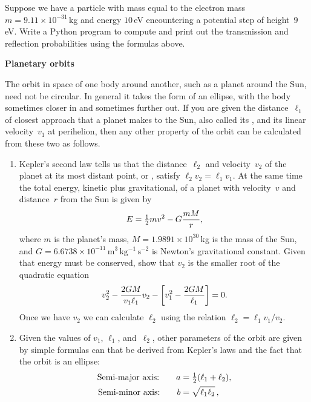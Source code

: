 \documentclass[12pt]{article}
\begin{document}
\begin{exercises}
Suppose we have a particle with mass equal to the electron mass
$m=9.11\times10^{-31}\,$kg and energy $10\,$eV encountering a potential
step of height~$9\,$eV.  Write a Python program to compute and print out
the transmission and reflection probabilities using the formulas above.



\exercise \textbf{Planetary orbits}

\nopagebreak\smallskip\noindent The orbit in space of one body
around another, such as a planet around the Sun, need not be
circular.  In general it takes the form of an ellipse, with the body
sometimes closer in and sometimes further out.  If you are given the
distance~$\ell_1$ of closest approach that a planet makes to the Sun, also
called its , and its linear velocity~$v_1$ at
perihelion, then any other property of the orbit can be calculated
from these two as follows.
\begin{enumerate}\setlength{\itemsep}{0pt}
\item Kepler's second law tells us that the distance~$\ell_2$ and
  velocity~$v_2$ of the planet at its most distant point, or
  , satisfy $\ell_2 v_2 = \ell_1 v_1$.  At the same
  time the total energy, kinetic plus gravitational, of a planet with
  velocity~$v$ and distance~$r$ from the Sun is given by
\begin{displaymath}
E = \tfrac12 m v^2 - G {mM\over r},
\end{displaymath}
where $m$ is the planet's mass, $M=1.9891\times10^{30}\,$kg is the mass of
the Sun, and $G=6.6738\times10^{-11}\,\mathrm{m^3\,kg^{-1}\,s^{-2}}$ is
Newton's gravitational constant.  Given that energy must be conserved, show
that $v_2$ is the smaller root of the quadratic equation
\begin{displaymath}
v_2^2 - {2GM\over v_1\ell_1} v_2 - \biggl[ v_1^2 - {2GM\over\ell_1}
  \biggr] = 0.
\end{displaymath}
Once we have $v_2$ we can calculate $\ell_2$ using the relation $\ell_2 =
\ell_1 v_1/v_2$.
\item Given the values of $v_1$, $\ell_1$, and~$\ell_2$, other parameters
  of the orbit are given by simple formulas can that be derived from
  Kepler's laws and the fact that the orbit is an ellipse:
\begin{align*}
\textrm{Semi-major axis:} \qquad a &= \half(\ell_1+\ell_2), \\
\textrm{Semi-minor axis:} \qquad b &= \sqrt{\ell_1\ell_2}\,, \\

\end{align*}
\end{enumerate}
\end{exercises}
\end{document}
